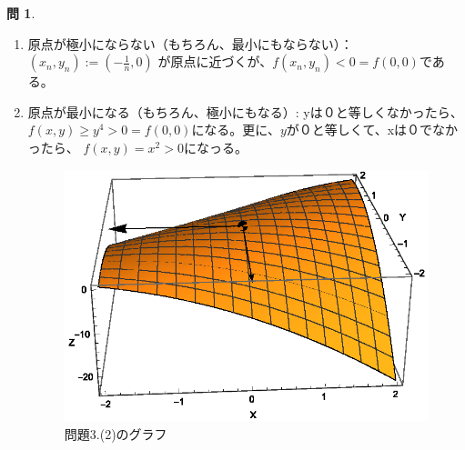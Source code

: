 \documentclass[12pt]{article} %
\theoremstyle{definition}
\newtheorem{question}{問}
\begin{document}
\begin{question}
	\begin{enumerate}[(1)]
		\item 原点が極小にならない（もちろん、最小にもならない）：
			$(x_n,y_n):=\left( -\frac{1}{n},0 \right)$ が原点に近づくが、$f(x_n,y_n)<0=f(0,0)$である。
		\item 原点が最小になる（もちろん、極小にもなる）:
			yは０と等しくなかったら、$f(x,y)\ge y^4>0=f(0,0)$になる。更に、$y$が０と等しくて、xは０でなかったら、
			$f(x,y)=x^2>0$になっる。
			\begin{figure}[h!]
				\centering
				\includegraphics{3d2}
				\caption{問題3.(2)のグラフ}
			\end{figure}
	\end{enumerate}
\end{question}
\end{document}
